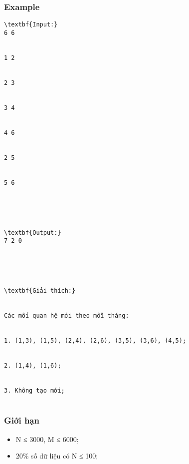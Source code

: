 \subsubsection{   Example  }
\begin{verbatim}
\textbf{Input:}
6 6


1 2


2 3


3 4


4 6


2 5


5 6





\textbf{Output:}
7 2 0





\textbf{Giải thích:}


Các mối quan hệ mới theo mỗi tháng:


1. (1,3), (1,5), (2,4), (2,6), (3,5), (3,6), (4,5);


2. (1,4), (1,6);


3. Không tạo mới;


\end{verbatim}

\subsubsection{   Giới hạn  }
\begin{itemize}
	\item     N ≤ 3000, M ≤ 6000;   
	\item     20\% số dữ liệu có N ≤ 100;   
\end{itemize}
